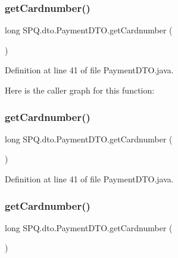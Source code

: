 \subsubsection{\texorpdfstring{get\+Cardnumber()}{getCardnumber()}\hspace{0.1cm}{\footnotesize\ttfamily [1/3]}}
{\footnotesize\ttfamily long S\+P\+Q.\+dto.\+Payment\+D\+T\+O.\+get\+Cardnumber (\begin{DoxyParamCaption}{ }\end{DoxyParamCaption})}



Definition at line 41 of file Payment\+D\+T\+O.\+java.

Here is the caller graph for this function\+:
\mbox{\label{class_s_p_q_1_1dto_1_1_payment_d_t_o_ac2a8a2ab315f3027f25780a84da0b824}} 
\subsubsection{\texorpdfstring{get\+Cardnumber()}{getCardnumber()}\hspace{0.1cm}{\footnotesize\ttfamily [2/3]}}
{\footnotesize\ttfamily long S\+P\+Q.\+dto.\+Payment\+D\+T\+O.\+get\+Cardnumber (\begin{DoxyParamCaption}{ }\end{DoxyParamCaption})}



Definition at line 41 of file Payment\+D\+T\+O.\+java.

\mbox{\label{class_s_p_q_1_1dto_1_1_payment_d_t_o_ac2a8a2ab315f3027f25780a84da0b824}} 
\subsubsection{\texorpdfstring{get\+Cardnumber()}{getCardnumber()}\hspace{0.1cm}{\footnotesize\ttfamily [3/3]}}
{\footnotesize\ttfamily long S\+P\+Q.\+dto.\+Payment\+D\+T\+O.\+get\+Cardnumber (\begin{DoxyParamCaption}{ }\end{DoxyParamCaption})}



